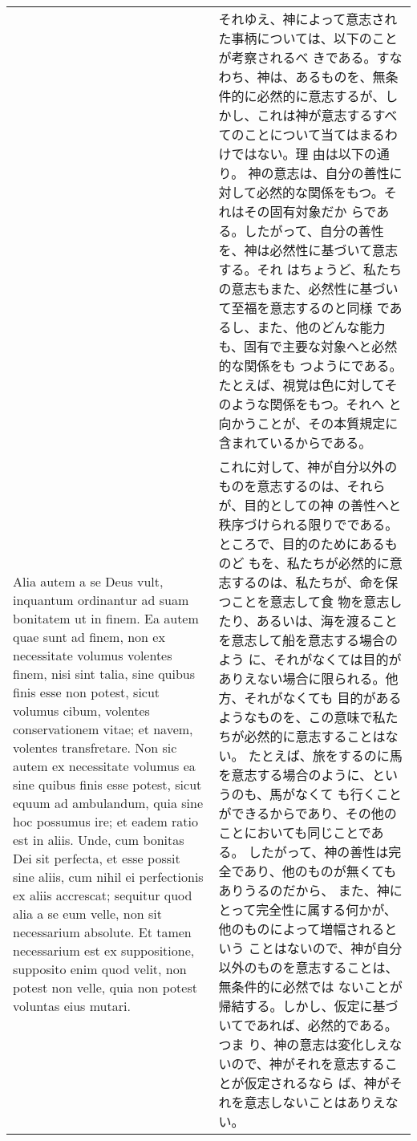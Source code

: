 \documentclass[10pt]{jsarticle} %
\begin{document}
\begin{longtable}{p{21em}p{21em}}
 &

 それゆえ、神によって意志された事柄については、以下のことが考察されるべ
 きである。すなわち、神は、あるものを、無条件的に必然的に意志するが、し
 かし、これは神が意志するすべてのことについて当てはまるわけではない。理
 由は以下の通り。
神の意志は、自分の善性に対して必然的な関係をもつ。それはその固有対象だか
 らである。したがって、自分の善性を、神は必然性に基づいて意志する。それ
 はちょうど、私たちの意志もまた、必然性に基づいて至福を意志するのと同様
 であるし、また、他のどんな能力も、固有で主要な対象へと必然的な関係をも
 つようにである。たとえば、視覚は色に対してそのような関係をもつ。それへ
 と向かうことが、その本質規定に含まれているからである。


 \\


 Alia autem a se Deus vult, inquantum ordinantur ad suam
bonitatem ut in finem. Ea autem quae sunt ad finem, non ex necessitate
volumus volentes finem, nisi sint talia, sine quibus finis esse non
potest, sicut volumus cibum, volentes conservationem vitae; et navem,
volentes transfretare. Non sic autem ex necessitate volumus ea sine
quibus finis esse potest, sicut equum ad ambulandum, quia sine hoc
possumus ire; et eadem ratio est in aliis. Unde, cum bonitas Dei sit
perfecta, et esse possit sine aliis, cum nihil ei perfectionis ex aliis
accrescat; sequitur quod alia a se eum velle, non sit necessarium
absolute. Et tamen necessarium est ex suppositione, supposito enim quod
velit, non potest non velle, quia non potest voluntas eius mutari.

&

これに対して、神が自分以外のものを意志するのは、それらが、目的としての神
 の善性へと秩序づけられる限りでである。ところで、目的のためにあるものど
 もを、私たちが必然的に意志するのは、私たちが、命を保つことを意志して食
 物を意志したり、あるいは、海を渡ることを意志して船を意志する場合のよう
 に、それがなくては目的がありえない場合に限られる。他方、それがなくても
 目的があるようなものを、この意味で私たちが必然的に意志することはない。
 たとえば、旅をするのに馬を意志する場合のように、というのも、馬がなくて
 も行くことができるからであり、その他のことにおいても同じことである。
 したがって、神の善性は完全であり、他のものが無くてもありうるのだから、
 また、神にとって完全性に属する何かが、他のものによって増幅されるという
 ことはないので、神が自分以外のものを意志することは、無条件的に必然では
 ないことが帰結する。しかし、仮定に基づいてであれば、必然的である。つま
 り、神の意志は変化しえないので、神がそれを意志することが仮定されるなら
 ば、神がそれを意志しないことはありえない。
 


\end{longtable}
\end{document}
